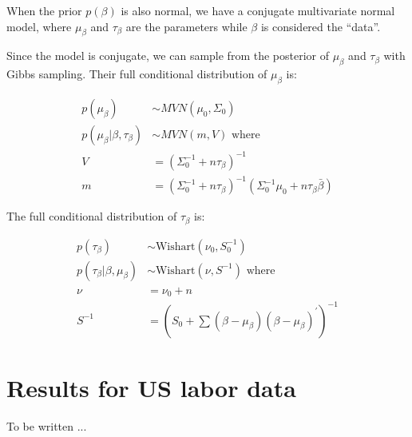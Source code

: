 When the prior $p(\beta)$ is also normal, we have a conjugate multivariate
normal model, where $\mu_{\beta}$ and $\tau_{\beta}$ are the parameters while
$\beta$ is considered the ``data''.

Since the model is conjugate, we can sample from the posterior of $\mu_{\beta}$
and $\tau_{\beta}$ with Gibbs sampling. Their full conditional distribution of
$\mu_{\beta}$ is:

\begin{align}
  p(\mu_{\beta}) &\sim MVN(\mu_0, \Sigma_0) \\
  p(\mu_{\beta} | \beta, \tau_{\beta}) &\sim MVN(m, V) \text{ where } \\
  V &= (\Sigma_0^{-1} + n \tau_{\beta})^{-1} \\
  m &= (\Sigma_0^{-1} + n \tau_{\beta})^{-1} (\Sigma_0^{-1}\mu_0 + n \tau_{\beta} \bar \beta)
\end{align}

The full conditional distribution of $\tau_{\beta}$ is:

\begin{align}
 p(\tau_{\beta}) &\sim \text{Wishart}(\nu_0, S_0^{-1}) \\
  p(\tau_{\beta} | \beta, \mu_{\beta}) &\sim \text{Wishart}(\nu, S^{-1}) \text{ where } \\
  \nu &= \nu_0 + n \\
  S^{-1} &= \left(S_0 + \sum (\beta - \mu_{\beta})(\beta - \mu_{\beta})^{\prime}\right)^{-1}
\end{align}

\section{Results for US labor data}

To be written ...